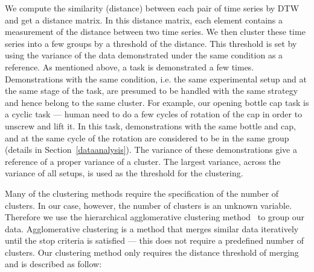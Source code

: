 We compute the similarity (distance) between each pair of time series by DTW and get a distance matrix. In this distance matrix, each
element contains a measurement of the distance between two time
series. We then cluster these time series into a few groups by a
threshold of the distance. This threshold is set by using the
variance of the data demonstrated under the same condition as a reference. As mentioned
above, a task is demonstrated a few times.
Demonstrations with the same condition, i.e. the same experimental setup and at the same stage of the task, are presumed to be handled with the same strategy and hence belong to the same cluster. For example, our opening bottle cap task is a cyclic task --- human need to do a few cycles of rotation of the cap in order to unscrew and lift it. In this task, demonstrations with the same bottle and cap, and at the same cycle of the rotation are considered to be in the same group (details in Section~\ref{dataanalysis}).
The variance of these demonstrations
give a reference of a proper variance of a cluster. The largest
variance, across the variance of all setups, is used as the threshold
for the clustering.  %

Many of the clustering methods require the specification of the number
of clusters. In our case, however, the number of clusters is an
unknown variable. Therefore we use the hierarchical agglomerative
clustering method~\citep{willett1988recent} to group our
data. Agglomerative clustering is a method that merges similar data
iteratively until the stop criteria is satisfied --- this does not
require a predefined number of clusters. Our clustering method only requires the distance threshold of merging and is described as follow:

